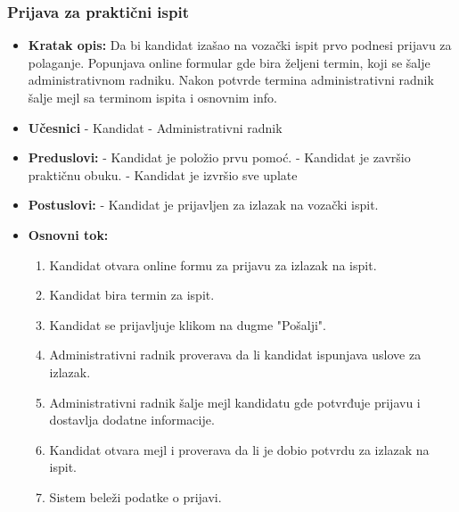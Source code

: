 \subsubsection{Prijava za praktični ispit}

\vspace{3mm}

\begin{itemize}

\item \textbf{Kratak opis:} Da bi kandidat izašao na vozački ispit prvo podnesi prijavu za polaganje. Popunjava online formular gde bira željeni termin, koji se  šalje administrativnom radniku. Nakon potvrde termina administrativni radnik šalje mejl sa terminom ispita i osnovnim info.

\vspace{2mm}

\item \textbf{Učesnici} \newline
   - Kandidat \newline   
   - Administrativni radnik 
   
\item \textbf{Preduslovi:} \newline
   - Kandidat je položio prvu pomoć. \newline
   - Kandidat je završio praktičnu obuku. \newline
   - Kandidat je izvršio sve uplate

\item \textbf{Postuslovi:} \newline
    - Kandidat je prijavljen za izlazak na vozački ispit.

\item \textbf{Osnovni tok:}  
   \begin{enumerate}
   \item Kandidat otvara online formu za prijavu za izlazak na ispit.
   \item Kandidat bira termin za ispit.
   \item Kandidat se prijavljuje klikom na dugme "Pošalji".
   \item Administrativni radnik proverava da li kandidat ispunjava uslove za izlazak.
   \item Administrativni radnik šalje mejl kandidatu gde potvrđuje prijavu i dostavlja dodatne informacije.
   \item Kandidat otvara mejl i proverava da li je dobio potvrdu za izlazak na ispit. 
   \item Sistem beleži podatke o prijavi. 
   \end{enumerate}


\end{itemize}
